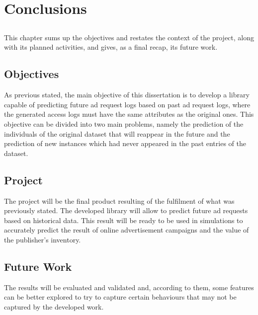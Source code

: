 \chapter{Conclusions}\label{chap:chap4}

\section*{}

This chapter sums up the objectives and restates the context of the project, along with its planned activities, and gives, as a final recap, its future work.

\section{Objectives}

As previous stated, the main objective of this dissertation is to develop a library capable of predicting future ad request logs based on past ad request logs,
where the generated access logs must have the same attributes as the original ones. This objective can be divided into two main problems, namely the
prediction of the individuals of the original dataset that will reappear in the future and the prediction of new instances which had never appeared
in the past entries of the dataset. 

\section{Project}

The project will be the final product resulting of the fulfilment of what was previously stated.
The developed library will allow to predict future ad requests based on
historical data. This result will be ready to be used in simulations to
accurately predict the result of online advertisement campaigns and the value of
the publisher's inventory.


\section{Future Work}

The results will be evaluated and validated and, according to them, some features can be better explored to try to capture certain behaviours that may not be captured by the developed work.
